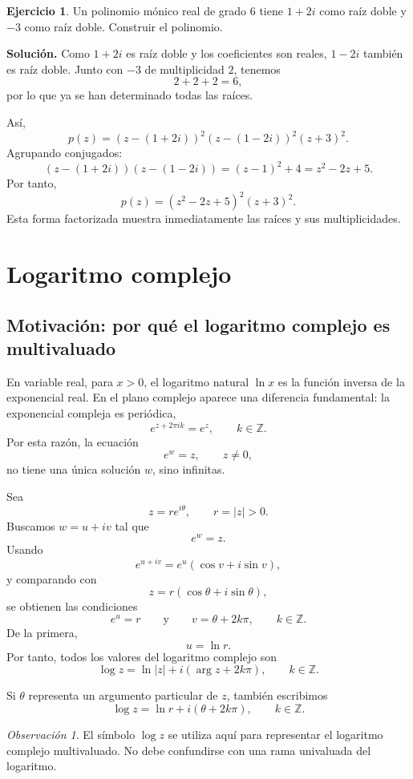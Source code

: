 \documentclass[12pt]{article}
\theoremstyle{definition}
\newtheorem{ejercicio}{Ejercicio}[section]
\theoremstyle{remark}
\newtheorem{observacion}{Observación}[section]
\begin{document}
\begin{ejercicio}
Un polinomio mónico real de grado $6$ tiene $1+2i$ como raíz doble y $-3$
como raíz doble. Construir el polinomio.
\end{ejercicio}

\textbf{Solución.}
Como $1+2i$ es raíz doble y los coeficientes son reales, $1-2i$ también es
raíz doble. Junto con $-3$ de multiplicidad $2$, tenemos
\[
2+2+2=6,
\]
por lo que ya se han determinado todas las raíces.

Así,
\[
p(z)=(z-(1+2i))^2(z-(1-2i))^2(z+3)^2.
\]
Agrupando conjugados:
\[
(z-(1+2i))(z-(1-2i))
=(z-1)^2+4
=z^2-2z+5.
\]
Por tanto,
\[
\boxed{
p(z)=(z^2-2z+5)^2(z+3)^2.
}
\]
Esta forma factorizada muestra inmediatamente las raíces y sus
multiplicidades.


\section{Logaritmo complejo}

\subsection{Motivación: por qué el logaritmo complejo es multivaluado}

En variable real, para $x>0$, el logaritmo natural $\ln x$ es la función
inversa de la exponencial real. En el plano complejo aparece una diferencia
fundamental: la exponencial compleja es periódica,
\[
e^{z+2\pi i k}=e^z,\qquad k\in\mathbb Z.
\]
Por esta razón, la ecuación
\[
e^w=z,\qquad z\neq0,
\]
no tiene una única solución $w$, sino infinitas.

Sea
\[
z=re^{i\theta},\qquad r=|z|>0.
\]
Buscamos $w=u+iv$ tal que
\[
e^w=z.
\]
Usando
\[
e^{u+iv}=e^u(\cos v+i\sin v),
\]
y comparando con
\[
z=r(\cos\theta+i\sin\theta),
\]
se obtienen las condiciones
\[
e^u=r
\qquad\text{y}\qquad
v=\theta+2k\pi,\qquad k\in\mathbb Z.
\]
De la primera,
\[
u=\ln r.
\]
Por tanto, todos los valores del logaritmo complejo son
\[
\boxed{
\log z=\ln|z|+i(\arg z+2k\pi),\qquad k\in\mathbb Z.
}
\]

Si $\theta$ representa un argumento particular de $z$, también escribimos
\[
\boxed{
\log z=\ln r+i(\theta+2k\pi),\qquad k\in\mathbb Z.
}
\]

\begin{observacion}
El símbolo $\log z$ se utiliza aquí para representar el logaritmo complejo
multivaluado. No debe confundirse con una rama univaluada del logaritmo.
\end{observacion}
\end{document}
